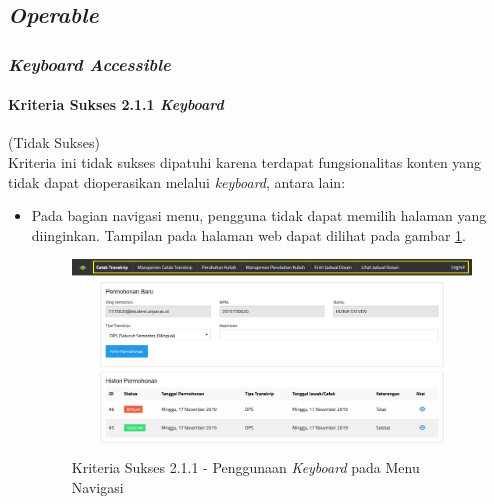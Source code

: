 \documentclass[a4paper,twoside]{article}
\begin{document}
\begin{enumerate}
		\subsection*{\textit{Operable}}
		\label{subsec:kepatuhan_bluetape_operable}

		\subsubsection*{\textit{Keyboard Accessible}}
		\label{subsubsec:kepatuhan_bluetape_keyboard_accessible}

		\paragraph{Kriteria Sukses 2.1.1 \textit{Keyboard}}
		\label{par:kepatuhan_bluetape_kriteria_sukses_2.1.1}
		(Tidak Sukses)\\

		Kriteria ini tidak sukses dipatuhi karena terdapat fungsionalitas konten yang tidak dapat dioperasikan melalui \textit{keyboard}, antara lain:

		\begin{itemize}
			\item Pada bagian navigasi menu, pengguna tidak dapat memilih halaman yang diinginkan. Tampilan pada halaman web dapat dilihat pada gambar \ref{fig:2.1.1_keyboard_1}.
			\begin{figure}[H]
				\centering  
				\includegraphics[scale=0.3, frame]{kriteria-sukses-2-1-1-keyboard-1}  
				\caption[Kriteria Sukses 2.1.1 - Penggunaan \textit{Keyboard} pada Menu Navigasi]{Kriteria Sukses 2.1.1 - Penggunaan \textit{Keyboard} pada Menu Navigasi}
				\label{fig:2.1.1_keyboard_1}  
			\end{figure} 


\end{itemize}
\end{enumerate}
\end{document}
